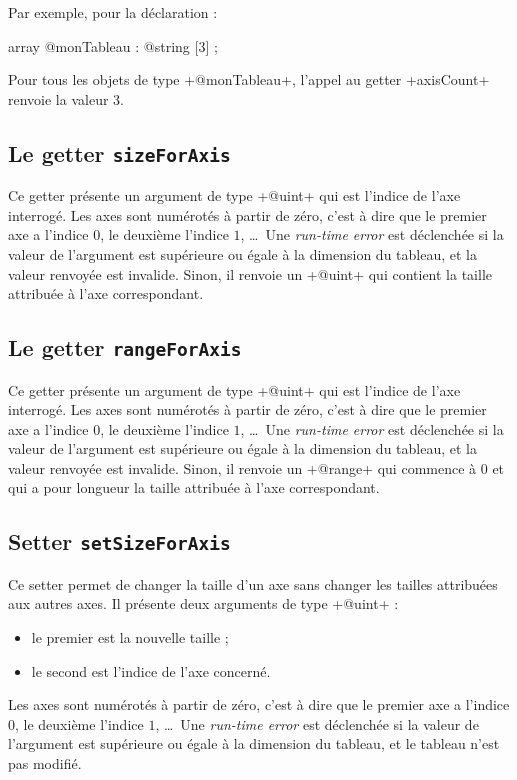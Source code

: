 Par exemple, pour la déclaration :
\begin{galgas}
array @monTableau : @string [3] ;
\end{galgas}
Pour tous les objets de type \ggs+@monTableau+, l'appel au getter \ggs+axisCount+ renvoie la valeur $3$.


\subsection{Le getter \texttt{sizeForAxis}}

Ce getter présente un argument de type \ggs+@uint+ qui est l'indice de l'axe interrogé. Les axes sont numérotés à partir de zéro, c'est à dire que le premier axe a l'indice $0$, le deuxième l'indice $1$, \dots~Une \emph{run-time error} est déclenchée si la valeur de l'argument est supérieure ou égale à la dimension du tableau, et la valeur renvoyée est invalide. Sinon, il renvoie un \ggs+@uint+ qui contient la taille attribuée à l'axe correspondant.


\subsection{Le getter \texttt{rangeForAxis}}

Ce getter présente un argument de type \ggs+@uint+ qui est l'indice de l'axe interrogé. Les axes sont numérotés à partir de zéro, c'est à dire que le premier axe a l'indice $0$, le deuxième l'indice $1$, \dots~Une \emph{run-time error} est déclenchée si la valeur de l'argument est supérieure ou égale à la dimension du tableau, et la valeur renvoyée est invalide. Sinon, il renvoie un \ggs+@range+ qui commence à $0$ et qui a pour longueur la taille attribuée à l'axe correspondant.




\subsection{Setter \texttt{setSizeForAxis}}

Ce setter permet de changer la taille d'un axe sans changer les tailles attribuées aux autres axes. Il présente deux arguments de type \ggs+@uint+ :
\begin{itemize}
  \item le premier est la nouvelle taille ;
  \item le second est l'indice de l'axe concerné.
\end{itemize}

Les axes sont numérotés à partir de zéro, c'est à dire que le premier axe a l'indice $0$, le deuxième l'indice $1$, \dots~Une \emph{run-time error} est déclenchée si la valeur de l'argument est supérieure ou égale à la dimension du tableau, et le tableau n'est pas modifié.
 
